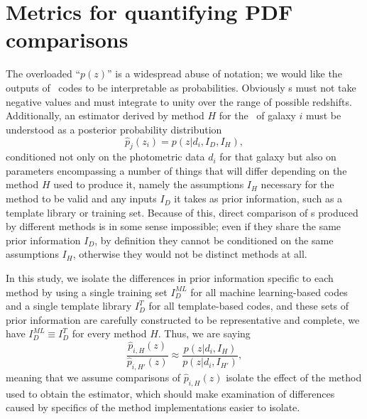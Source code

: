 \section{Metrics for quantifying PDF comparisons}
\label{sec:metrics}


The overloaded ``$p(z)$'' is a widespread abuse of notation; we would like the outputs of \pzpdf\ codes to be interpretable as probabilities.
Obviously \pzpdf s must not take negative values and must integrate to unity over the range of possible redshifts.
Additionally, an estimator derived by method $H$ for the \pzpdf\ of galaxy $i$ must be understood as a posterior probability distribution
\begin{equation}
\hat{p}_{j}(z_{i}) = p(z | d_{i}, I_{D}, I_{H}),
\end{equation}
conditioned not only on the photometric data $d_{i}$ for that galaxy but also on parameters encompassing a number of things that will differ depending on the method $H$ used to produce it, namely the assumptions $I_{H}$ necessary for the method to be valid and any inputs $I_{D}$ it takes as prior information, such as a template library or training set.
Because of this, direct comparison of \pzpdf s produced by different methods is in some sense impossible; even if they share the same prior information $I_{D}$, by definition they cannot be conditioned on the same assumptions $I_{H}$, otherwise they would not be distinct methods at all.

In this study, we isolate the differences in prior information specific to each method by using a single training set $I_{D}^{ML}$ for all machine learning-based codes and a single template library $I_{D}^{T}$ for all template-based codes, and these sets of prior information are carefully constructed to be representative and complete, we have $I_{D}^{ML}\equiv I_{D}^{T}$ for every method $H$.
Thus, we are saying
\begin{equation}
\frac{\hat{p}_{i, H}(z)}{\hat{p}_{i, H'}(z)} \approx \frac{p(z | d_{i}, I_{H})}{p(z | d_{i}, I_{H'})},
\end{equation}
meaning that we assume comparisons of $\hat{p}_{i, H}(z)$ isolate the effect of the method used to obtain the estimator, which should make examination of differences caused by specifics of the method implementations easier to isolate.

